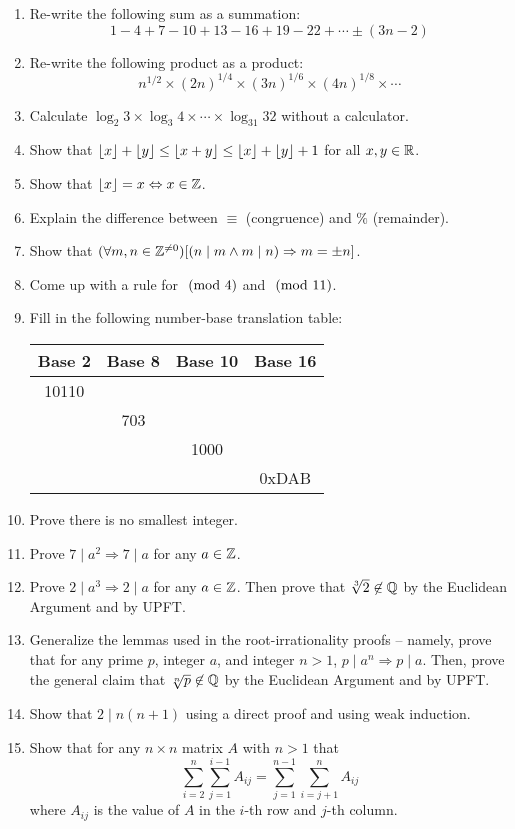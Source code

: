 \documentclass[main.tex]{subfiles}
\begin{document}
\begin{enumerate}
	\item Re-write the following sum as a summation: \[1-4+7-10+13-16+19-22+ \cdots \pm (3n-2)\]
	\item Re-write the following product as a product: \[n^{1/2} \times (2n)^{1/4} \times (3n)^{1/6} \times (4n)^{1/8} \times \cdots \]
	\item Calculate \(\log_2 3 \times \log_3 4 \times \cdots \times \log_{31} 32\) without a calculator.
	\item Show that \(\lfloor x\rfloor + \lfloor y\rfloor \leq \lfloor x+y\rfloor \leq \lfloor x\rfloor + \lfloor y\rfloor + 1\) for all \(x,y \in \mathbb{R}\).
	\item Show that \(\lfloor x\rfloor = x \Leftrightarrow x \in \mathbb{Z}\).
	\item Explain the difference between \(\equiv\) (congruence) and \(\%\) (remainder).
	\item Show that \((\forall m,n \in \mathbb{Z}^{\neq 0})[(n \mid m \land m \mid n) \Rightarrow m = \pm n]\).
	\item Come up with a rule for \(\ (\mathrm{mod}\ 4)\) and \(\ (\mathrm{mod}\ 11)\).
	\item Fill in the following number-base translation table:
	
	\begin{tabular}{cccc}
		Base 2 & Base 8 & Base 10 & Base 16 \\
		\midrule
		10110 & & & \\
		\midrule
		& 703 & & \\
		\midrule
		& & 1000 & \\
		\midrule
		& & & 0xDAB
	\end{tabular}
	
	\item Prove there is no smallest integer.
	\item Prove \(7 \mid a^2 \Rightarrow 7 \mid a\) for any \(a \in \mathbb{Z}\).
	\item Prove \(2 \mid a^3 \Rightarrow 2 \mid a\) for any \(a \in \mathbb{Z}\). Then prove that \(\sqrt[3]{2} \not\in \mathbb{Q}\) by the Euclidean Argument and by UPFT.
	\item Generalize the lemmas used in the root-irrationality proofs -- namely, prove that for any prime \(p\), integer \(a\), and integer \(n > 1\), \(p \mid a^n \Rightarrow p \mid a\). Then, prove the general claim that \(\sqrt[n]{p} \not\in \mathbb{Q}\) by the Euclidean Argument and by UPFT.
	
	\item Show that \(2 \mid n(n+1)\) using a direct proof and using weak induction.
	\item Show that for any \(n \times n\) matrix \(A\) with \(n > 1\) that \[\sum_{i=2}^{n} \sum_{j=1}^{i-1} A_{ij} = \sum_{j=1}^{n-1} \sum_{i=j+1}^{n} A_{ij}\] where \(A_{ij}\) is the value of \(A\) in the \(i\)-th row and \(j\)-th column.
	

\end{enumerate}
\end{document}
